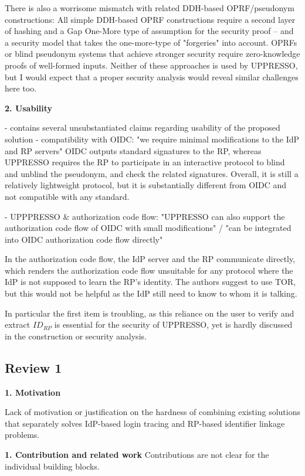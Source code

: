 \documentclass[letterpaper,onecolumn,10pt]{article}
\begin{document}
There is also a worrisome mismatch with related DDH-based OPRF/pseudonym constructions: All simple DDH-based OPRF constructions require a second layer of hashing and a Gap One-More type of assumption for the security proof -- and a security model that takes the one-more-type of "forgeries" into account. OPRFs or blind pseudonym systems that achieve stronger security require zero-knowledge proofs of well-formed inputs. Neither of these approaches is used by UPPRESSO, but I would expect that a proper security analysis would reveal similar challenges here too.

\noindent\textbf{2. Usability}

- contains several unsubstantiated claims regarding usability of the proposed solution
- compatibility with OIDC: "we require minimal modifications to the IdP and RP servers"
OIDC outputs standard signatures to the RP, whereas UPPRESSO requires the RP to participate in an interactive protocol to blind and unblind the pseudonym, and check the related signatures. Overall, it is still a relatively lightweight protocol, but it is substantially different from OIDC and not compatible with any standard.

- UPPPRESSO \& authorization code flow: "UPPRESSO can also support the authorization code flow of
OIDC with small modifications" / "can be integrated into OIDC authorization code flow directly"

In the authorization code flow, the IdP server and the RP communicate directly, which renders the authorization code flow unsuitable for any protocol where the IdP is not supposed to learn the RP's identity. The authors suggest to use TOR, but this would not be helpful as the IdP still need to know to whom it is talking.

In particular the first item is troubling, as this reliance on the user to verify and extract $ID_{RP}$ is essential for the security of UPPRESSO, yet is hardly discussed in the construction or security analysis.



\subsection*{Review 1}
\noindent\textbf{1. Motivation}

Lack of motivation or justification on the hardness of combining existing solutions that separately solves IdP-based login tracing and RP-based identifier linkage problems.

\noindent\textbf{1. Contribution and related work}
Contributions are not clear for the individual building blocks.
\end{document}
